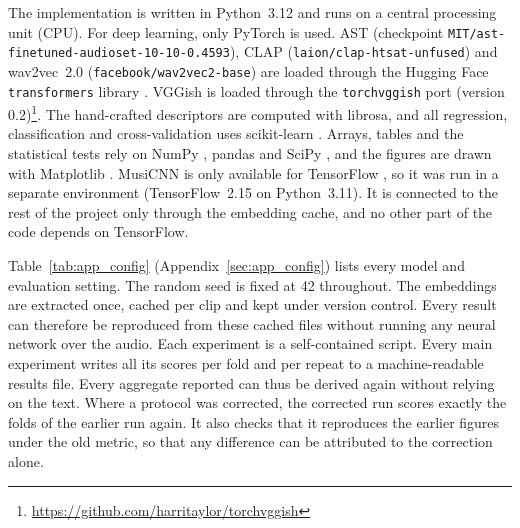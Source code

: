 The implementation is written in Python~3.12 and runs on a central processing unit (CPU). For deep learning, only PyTorch \citep{paszke2019pytorch} is used. AST (checkpoint \texttt{MIT/ast-finetuned-audioset-10-10-0.4593}), CLAP (\texttt{laion/clap-htsat-unfused}) and wav2vec~2.0 (\texttt{facebook/wav2vec2-base}) are loaded through the Hugging Face \texttt{transformers} library \citep{wolf2020transformers}. VGGish is loaded through the \texttt{torchvggish} port (version 0.2)\footnote{\url{https://github.com/harritaylor/torchvggish}}. The hand-crafted descriptors are computed with librosa, and all regression, classification and cross-validation uses scikit-learn \citep{pedregosa2011scikit}. Arrays, tables and the statistical tests rely on NumPy \citep{harris2020array}, pandas \citep{mckinney2010data} and SciPy \citep{virtanen2020scipy}, and the figures are drawn with Matplotlib \citep{hunter2007matplotlib}. MusiCNN is only available for TensorFlow \citep{abadi2016tensorflow}, so it was run in a separate environment (TensorFlow~2.15 on Python~3.11). It is connected to the rest of the project only through the embedding cache, and no other part of the code depends on TensorFlow.

Table~\ref{tab:app_config} (Appendix~\ref{sec:app_config}) lists every model and evaluation setting. The random seed is fixed at 42 throughout. The embeddings are extracted once, cached per clip and kept under version control. Every result can therefore be reproduced from these cached files without running any neural network over the audio. Each experiment is a self-contained script. Every main experiment writes all its scores per fold and per repeat to a machine-readable results file. Every aggregate reported can thus be derived again without relying on the text. Where a protocol was corrected, the corrected run scores exactly the folds of the earlier run again. It also checks that it reproduces the earlier figures under the old metric, so that any difference can be attributed to the correction alone.

